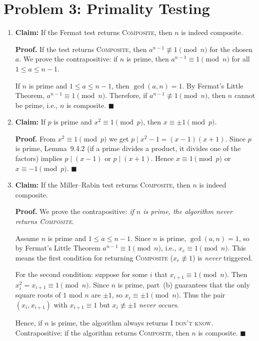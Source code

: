 \documentclass[11pt]{article}
\begin{document}
\section*{Problem 3: Primality Testing}
\begin{enumerate}[label=\textbf{(\alph*)}]

\item \textbf{Claim:} If the Fermat test returns \textsc{Composite}, then $n$ is indeed composite.

\textbf{Proof.} If the test returns \textsc{Composite}, then $a^{n-1}\not\equiv 1\pmod{n}$ for the chosen $a$. We prove the contrapositive: if $n$ is prime, then $a^{n-1}\equiv 1\pmod{n}$ for all $1\le a\le n-1$.

If $n$ is prime and $1\le a\le n-1$, then $\gcd(a,n)=1$. By Fermat's Little Theorem, $a^{n-1}\equiv 1\pmod{n}$. Therefore, if $a^{n-1}\not\equiv 1\pmod{n}$, then $n$ cannot be prime, i.e., $n$ is composite. $\blacksquare$

\item \textbf{Claim:} If $p$ is prime and $x^2\equiv 1\pmod{p}$, then $x\equiv \pm 1\pmod{p}$.

\textbf{Proof.} From $x^2\equiv 1\pmod{p}$ we get $p\mid x^2 - 1 = (x-1)(x+1)$. Since $p$ is prime, Lemma~9.4.2 (if a prime divides a product, it divides one of the factors) implies $p\mid (x-1)$ or $p\mid(x+1)$. Hence $x\equiv 1\pmod{p}$ or $x\equiv -1\pmod{p}$. $\blacksquare$

\item \textbf{Claim:} If the Miller--Rabin test returns \textsc{Composite}, then $n$ is indeed composite.

\textbf{Proof.} We prove the contrapositive: \emph{if $n$ is prime, the algorithm never returns \textsc{Composite}}.

Assume $n$ is prime and $1\le a\le n-1$. Since $n$ is prime, $\gcd(a,n)=1$, so by Fermat's Little Theorem $a^{n-1}\equiv 1\pmod{n}$, i.e., $x_e\equiv 1\pmod{n}$. This means the first condition for returning \textsc{Composite} ($x_e\not\equiv 1$) is \emph{never} triggered.

For the second condition: suppose for some $i$ that $x_{i+1}\equiv 1\pmod{n}$. Then $x_i^2 = x_{i+1}\equiv 1\pmod{n}$. Since $n$ is prime, part~(b) guarantees that the only square roots of $1$ mod $n$ are $\pm 1$, so $x_i\equiv\pm 1\pmod{n}$. Thus the pair $(x_i, x_{i+1})$ with $x_{i+1}\equiv 1$ but $x_i\not\equiv\pm 1$ \emph{never occurs}.

Hence, if $n$ is prime, the algorithm always returns \textsc{I don't know}. Contrapositive: if the algorithm returns \textsc{Composite}, then $n$ is composite. $\blacksquare$

\end{enumerate}
\end{document}
